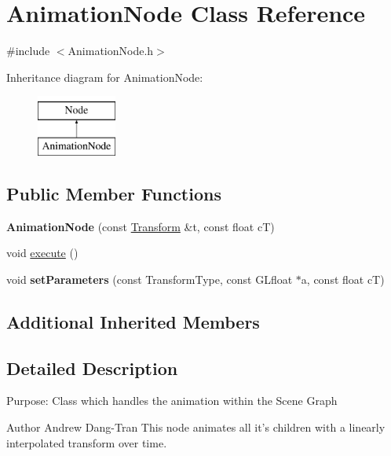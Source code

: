 \hypertarget{classAnimationNode}{\section{Animation\-Node Class Reference}
\label{classAnimationNode}
}


{\ttfamily \#include $<$Animation\-Node.\-h$>$}

Inheritance diagram for Animation\-Node\-:\begin{figure}[H]
\begin{center}
\leavevmode
\includegraphics[height=2.000000cm]{classAnimationNode}
\end{center}
\end{figure}
\subsection*{Public Member Functions}
\begin{DoxyCompactItemize}
\item 
\hypertarget{classAnimationNode_aba1bf01dcd4f64e57ed5de4d95098269}{{\bfseries Animation\-Node} (const \hyperlink{classTransform}{Transform} \&t, const float c\-T)}\label{classAnimationNode_aba1bf01dcd4f64e57ed5de4d95098269}

\item 
void \hyperlink{classAnimationNode_a0b0bb275a3f89f45aedd35f41f459f9f}{execute} ()
\item 
\hypertarget{classAnimationNode_af03e7eef1324f9eedbfa0fc4c225f5de}{void {\bfseries set\-Parameters} (const Transform\-Type, const G\-Lfloat $\ast$a, const float c\-T)}\label{classAnimationNode_af03e7eef1324f9eedbfa0fc4c225f5de}

\end{DoxyCompactItemize}
\subsection*{Additional Inherited Members}


\subsection{Detailed Description}
Purpose\-: Class which handles the animation within the Scene Graph \begin{DoxyAuthor}{Author}
Andrew Dang-\/\-Tran This node animates all it's children with a linearly interpolated transform over time. 
\end{DoxyAuthor}



